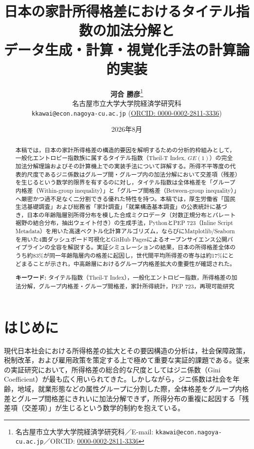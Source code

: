 \documentclass[paper=a4,fontsize=10.5pt,line_length=42zw]{jlreq}
\title{\LARGE\textbf{日本の家計所得格差におけるタイテル指数の加法分解と\\データ生成・計算・視覚化手法の計算論的実装}}
\author{
    \textbf{河合 勝彦}\thanks{名古屋市立大学大学院経済学研究科／E-mail: \texttt{kkawai@econ.nagoya-cu.ac.jp}／ORCID: \href{https://orcid.org/0000-0002-2811-3336}{0000-0002-2811-3336}} \\
    名古屋市立大学大学院経済学研究科 \\
    \texttt{kkawai@econ.nagoya-cu.ac.jp} \quad
    \small (\href{https://orcid.org/0000-0002-2811-3336}{ORCID: 0000-0002-2811-3336})
}
\date{2026年8月}
\begin{document}
\maketitle

\begin{abstract}
本稿では，日本の家計所得格差の構造的要因を解明するための分析的枠組みとして，一般化エントロピー指数族に属するタイテル指数（Theil-T Index, $GE(1)$）の完全加法分解理論およびその計算機上での実装手法について詳解する。所得不平等度の代表的尺度であるジニ係数はグループ間・グループ内の加法分解において交差項（残差）を生じるという数学的限界を有するのに対し，タイテル指数は全体格差を「グループ内格差（Within-group inequality）」と「グループ間格差（Between-group inequality）」へ厳密かつ過不足なく二分割できる優れた特性を持つ。本稿では，厚生労働省「国民生活基礎調査」および総務省「家計調査」「就業構造基本調査」の公表統計に基づき，日本の年齢階層別所得分布を模した合成ミクロデータ（対数正規分布とパレート裾野の結合分布，抽出ウェイト付き）の生成手法，PythonとPEP 723（Inline Script Metadata）を用いた高速ベクトル化計算アルゴリズム，ならびにMatplotlib/Seabornを用いた4面ダッシュボード可視化とGitHub Pagesによるオープンサイエンス公開パイプラインの全容を解説する。実証シミュレーションの結果，日本の所得格差全体のうち約83\%が同一年齢階層内の格差に起因し，世代間平均所得差の寄与は約17\%にとどまることが示され，中高齢層におけるグループ内格差拡大の重要性が確認された。
\vspace{0.8em}
\par\noindent\textbf{キーワード:} タイテル指数（Theil-T Index），一般化エントロピー指数，所得格差の加法分解，グループ内格差・グループ間格差，家計所得統計，PEP 723，再現可能研究
\end{abstract}

\vspace{1.5em}

\section{はじめに}
現代日本社会における所得格差の拡大とその要因構造の分析は，社会保障政策，税制改革，および雇用政策を策定する上で極めて重要な実証的課題である。従来の実証研究において，所得格差の総合的な尺度としてはジニ係数（Gini Coefficient）が最も広く用いられてきた。しかしながら，ジニ係数は社会を年齢，地域，就業形態などの属性グループに分割した際，全体格差をグループ内格差とグループ間格差にきれいに加法分解できず，所得分布の重複に起因する「残差項（交差項）」が生じるという数学的制約を抱えている\cite{cowell2011measuring,bourguignon1979decomposable}。
\end{document}
